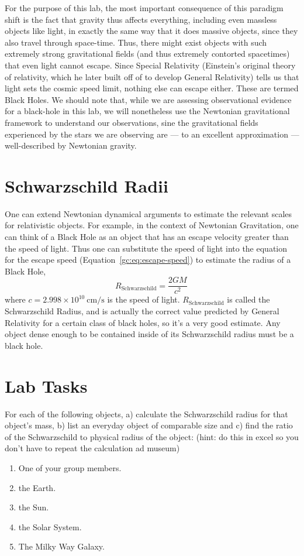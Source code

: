 For the purpose of this lab, the most important consequence of this paradigm shift is the fact that
gravity thus affects everything, including even massless objects like light, in exactly the same way that
it does massive objects, since they also travel through space-time. Thus, there might exist objects with 
such extremely strong gravitational fields (and thus extremely contorted spacetimes) that even light
cannot escape. Since Special Relativity (Einstein’s original theory of relativity, which he later built
off of to develop General Relativity) tells us that light sets the cosmic speed limit, nothing else can
escape either. These are termed Black Holes. We should note that, while we are assessing observational
evidence for a black-hole in this lab, we will nonetheless use the Newtonian gravitational framework to
understand our observations, sine the gravitational fields experienced by the stars we are observing are
--- to an excellent approximation --- well-described by Newtonian gravity.

\section{Schwarzschild Radii}

One can extend Newtonian dynamical arguments to estimate the relevant scales for relativistic objects.
For example, in the context of Newtonian Gravitation, one can think of a Black Hole as an object that
has an escape velocity greater than the speed of light. Thus one can substitute the speed of light into
the equation for the escape speed (Equation~\ref{gc:eq:escape-speed}) to estimate the radius of a Black Hole,
\begin{equation}
 R_\textrm{Schwarzschild} = \frac{2 G M}{c^2} \,
\end{equation}
where $c = 2.998 \times 10^{10}\:\mathrm{cm}/\mathrm{s}$ is the speed of light. $R_\textrm{Schwarzschild}$ is called the Schwarzschild Radius, and is actually the correct value predicted by General
Relativity for a certain class of black holes, so it’s a very good estimate. Any object dense enough to be
contained inside of its Schwarzschild radius must be a black hole.

\section{Lab Tasks}

For each of the following objects, a) calculate the Schwarzschild radius for that object’s mass, b) list
an everyday object of comparable size and c) find the ratio of the Schwarzschild to physical radius of
the object: (hint: do this in excel so you don’t have to repeat the calculation ad museum)
\begin{enumerate}
	\item One of your group members.
	\item the Earth.
	\item the Sun.
	\item the Solar System.
	\item The Milky Way Galaxy.
\end{enumerate}

